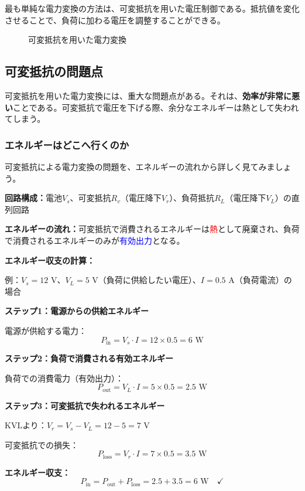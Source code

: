 最も単純な電力変換の方法は、可変抵抗を用いた電圧制御である。抵抗値を変化させることで、負荷に加わる電圧を調整することができる。

\begin{figure}[H]
\centering
{}
\caption{可変抵抗を用いた電力変換}
\label{fig:variable_resistor}
\end{figure}

\subsection{可変抵抗の問題点}

可変抵抗を用いた電力変換には、重大な問題点がある。それは、\textbf{効率が非常に悪い}ことである。可変抵抗で電圧を下げる際、余分なエネルギーは熱として失われてしまう。

\subsubsection{エネルギーはどこへ行くのか}

可変抵抗による電力変換の問題を、エネルギーの流れから詳しく見てみましょう。

\textbf{回路構成：}電池$V_s$、可変抵抗$R_v$（電圧降下$V_r$）、負荷抵抗$R_L$（電圧降下$V_L$）の直列回路

\textbf{エネルギーの流れ：}可変抵抗で消費されるエネルギーは\textcolor{red}{熱}として廃棄され、負荷で消費されるエネルギーのみが\textcolor{blue}{有効出力}となる。

\textbf{エネルギー収支の計算：}

\begin{screen}
例：$V_s = 12$ V、$V_L = 5$ V（負荷に供給したい電圧）、$I = 0.5$ A（負荷電流）の場合

\textbf{ステップ1：電源からの供給エネルギー}

電源が供給する電力：
\begin{equation}
P_{\text{in}} = V_s \cdot I = 12 \times 0.5 = 6 \text{ W}
\end{equation}

\textbf{ステップ2：負荷で消費される有効エネルギー}

負荷での消費電力（有効出力）：
\begin{equation}
P_{\text{out}} = V_L \cdot I = 5 \times 0.5 = 2.5 \text{ W}
\end{equation}

\textbf{ステップ3：可変抵抗で失われるエネルギー}

KVLより：$V_r = V_s - V_L = 12 - 5 = 7$ V

可変抵抗での損失：
\begin{equation}
P_{\text{loss}} = V_r \cdot I = 7 \times 0.5 = 3.5 \text{ W}
\end{equation}

\textbf{エネルギー収支：}
\begin{equation}
P_{\text{in}} = P_{\text{out}} + P_{\text{loss}} = 2.5 + 3.5 = 6 \text{ W} \quad \checkmark
\end{equation}
\end{screen}

